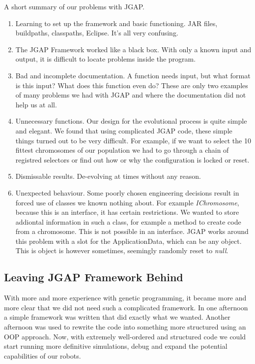 \documentclass[a4paper,10pt]{article}
\begin{document}
A short summary of our problems with JGAP.

\begin{enumerate}
    \item Learning to set up the framework and basic functioning. JAR files, buildpaths, classpaths, Eclipse. It's all very confusing.
    \item The JGAP Framework worked like a black box. With only a known input and output, it is difficult to locate problems inside the program. 
    \item Bad and incomplete documentation. A function needs input, but what format is this input? What does this function even do? These are only two examples of many problems we had with JGAP and where the documentation did not help us at all.
    \item Unnecessary functions. Our design for the evolutional process is quite simple and elegant. We found that using complicated JGAP code, these simple things turned out to be very difficult. For example, if we want to select the 10 fittest chromosomes of our population we had to go through a chain of registred selectors or find out how or why the configuration is locked or reset.
    \item Dismissable results. De-evolving at times without any reason.
    \item Unexpected behaviour. Some poorly chosen engineering decisions result in forced use of classes we known nothing about. For example \textit{IChromosome}, because this is an interface, it has certain restrictions. We wanted to store addiontal information in such a class, for example a method to create code from a chromosome. This is not possible in an interface. JGAP works around this problem with a slot for the ApplicationData, which can be any object. This is object is however sometimes, seemingly randomly reset to \textit{null}.
\end{enumerate}

\subsection{Leaving JGAP Framework Behind}
With more and more experience with genetic programming, it became more and more clear that we did not need such a complicated framework. In one afternoon a simple framework was written that did exactly what we wanted. Another afternoon was used to rewrite the code into something more structured using an OOP approach. Now, with extremely well-ordered and structured code we could start running more definitive simulations, debug and expand the potential capabilities of our robots.\\
\end{document}
